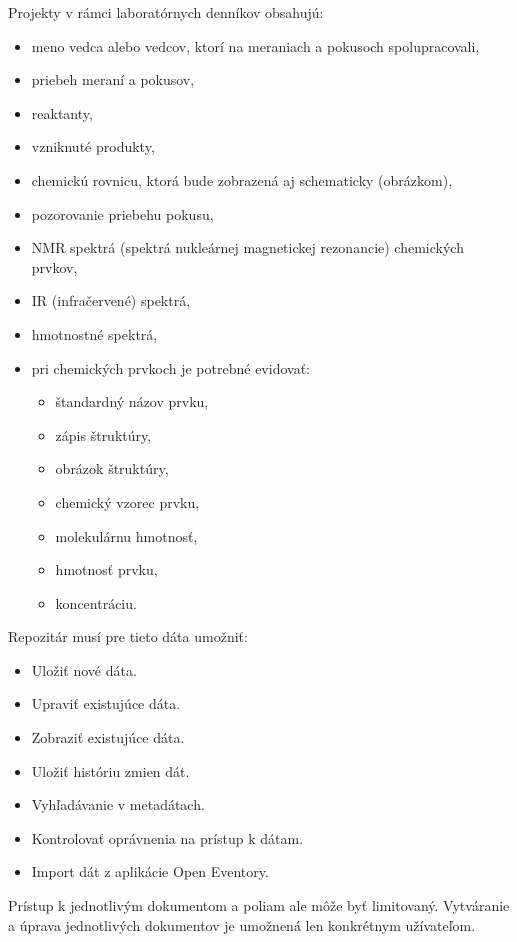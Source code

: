\documentclass[thesis=M,slovak]{FITthesis}[2013/05/06]
\begin{document}
Projekty v rámci laboratórnych denníkov obsahujú: 
		\begin{itemize}
			\item meno vedca alebo vedcov, ktorí na meraniach a pokusoch spolupracovali,
			\item priebeh meraní a pokusov,
			\item reaktanty,
			\item vzniknuté produkty,
			\item chemickú rovnicu, ktorá bude zobrazená aj schematicky (obrázkom),
			\item pozorovanie priebehu pokusu,
			\item NMR spektrá (spektrá nukleárnej magnetickej rezonancie) chemických prvkov,
			\item IR (infračervené) spektrá,
			\item hmotnostné spektrá,
			\item pri chemických prvkoch je potrebné evidovať:
				\begin{itemize}
					\item štandardný názov prvku,
					\item zápis štruktúry,
					\item obrázok štruktúry,
					\item chemický vzorec prvku,
					\item molekulárnu hmotnosť,
					\item hmotnosť prvku,
					\item koncentráciu.
				\end{itemize}
		\end{itemize}

Repozitár musí pre tieto dáta umožniť:
\begin{itemize}
	\item Uložiť nové dáta.
	\item Upraviť existujúce dáta.
	\item Zobraziť existujúce dáta.
	\item Uložiť históriu zmien dát.
	\item Vyhľadávanie v metadátach.
	\item Kontrolovať oprávnenia na prístup k dátam.
	\item Import dát z aplikácie Open Eventory.
\end{itemize}

Prístup k jednotlivým dokumentom a poliam ale môže byť limitovaný. Vytváranie a úprava jednotlivých dokumentov je umožnená len konkrétnym užívateľom.
\end{document}
